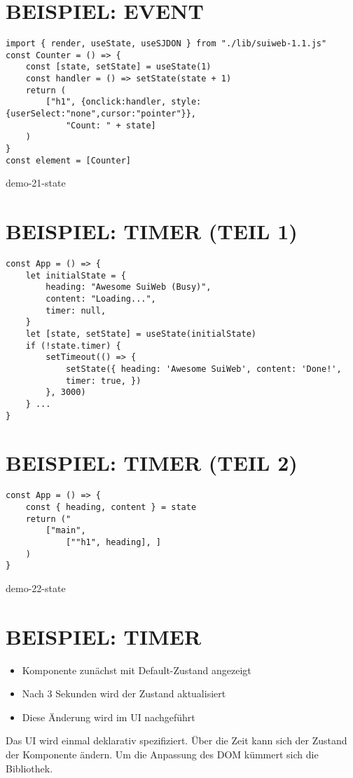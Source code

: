 \section*{BEISPIEL: EVENT}
\begin{verbatim}
import { render, useState, useSJDON } from "./lib/suiweb-1.1.js"
const Counter = () => {
    const [state, setState] = useState(1)
    const handler = () => setState(state + 1)
    return (
        ["h1", {onclick:handler, style:{userSelect:"none",cursor:"pointer"}},
            "Count: " + state]
    )
}
const element = [Counter]
\end{verbatim}

demo-21-state

\section*{BEISPIEL: TIMER (TEIL 1)}
\begin{verbatim}
const App = () => {
    let initialState = {
        heading: "Awesome SuiWeb (Busy)",
        content: "Loading...",
        timer: null,
    }
    let [state, setState] = useState(initialState)
    if (!state.timer) {
        setTimeout(() => {
            setState({ heading: 'Awesome SuiWeb', content: 'Done!',
            timer: true, })
        }, 3000)
    } ...
}
\end{verbatim}

\section*{BEISPIEL: TIMER (TEIL 2)}
\begin{verbatim}
const App = () => {
    const { heading, content } = state
    return ("
        ["main",
            [""h1", heading], ]
    )
}
\end{verbatim}

demo-22-state

\section*{BEISPIEL: TIMER}
\begin{itemize}
  \item Komponente zunächst mit Default-Zustand angezeigt
  \item Nach 3 Sekunden wird der Zustand aktualisiert
  \item Diese Änderung wird im UI nachgeführt
\end{itemize}

Das UI wird einmal deklarativ spezifiziert. Über die Zeit kann sich der Zustand der Komponente ändern. Um die Anpassung des DOM kümmert sich die Bibliothek.

